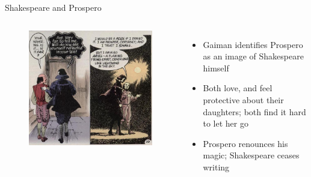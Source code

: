 \documentclass{beamer}
\begin{document}
\begin{frame}{Shakespeare and Prospero}
\begin{columns}[c]
      \begin{figure}[htp]
        \begin{center}
          \centering
          \includegraphics[scale=0.32]{../Presentation/prospere.jpg}
        \end{center}
      \end{figure}
      

      \begin{itemize}
      \item Gaiman identifies Prospero as an image of Shakespeare himself
      \item Both love, and feel protective about their daughters; both find it hard to let her go
      \item Prospero renounces his magic; Shakespeare ceases writing
      \end{itemize}
    \end{columns}
  \end{frame}
  
\end{document}
